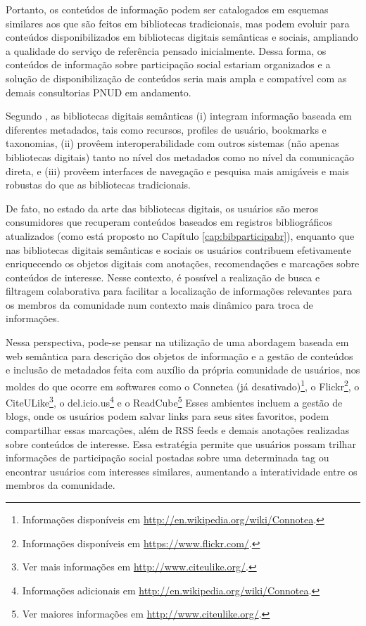 Portanto, os conteúdos de informação podem ser catalogados em esquemas similares aos que são feitos em bibliotecas tradicionais, mas podem evoluir para conteúdos disponibilizados em bibliotecas digitais semânticas e sociais, ampliando a qualidade do serviço de referência pensado inicialmente. Dessa forma, os conteúdos de informação sobre participação social estariam organizados e a solução de disponibilização de conteúdos seria mais ampla e compatível com as demais consultorias PNUD em andamento.

Segundo \cite{kruk2008semantic}, as bibliotecas digitais semânticas (i) integram informação baseada em diferentes metadados, tais como recursos, profiles de usuário, bookmarks e taxonomias, (ii) provêem interoperabilidade com outros sistemas (não apenas bibliotecas digitais) tanto no nível dos metadados como no nível da comunicação direta, e (iii) provêem interfaces de navegação e pesquisa  mais amigáveis e mais robustas do que as bibliotecas tradicionais.

De fato, no estado da arte das bibliotecas digitais, os usuários são meros consumidores que recuperam conteúdos baseados em registros bibliográficos atualizados (como está proposto no Capítulo \ref{cap:bibparticipabr}), enquanto que nas bibliotecas digitais semânticas e sociais os usuários contribuem efetivamente enriquecendo os objetos digitais com anotações, recomendações e marcações sobre conteúdos de interesse. Nesse contexto, é possível a realização de busca e filtragem colaborativa para facilitar a localização de informações relevantes para os membros da comunidade num contexto mais dinâmico para troca de informações.

Nessa perspectiva, pode-se pensar na utilização de uma abordagem baseada em web semântica para descrição dos objetos de informação e a gestão de conteúdos e inclusão de metadados feita com auxílio da própria comunidade de usuários, nos moldes do que ocorre em softwares como o Connetea (já desativado)\footnote{Informações disponíveis em \url{http://en.wikipedia.org/wiki/Connotea}.}, o Flickr\footnote{Informações disponíveis em \url{https://www.flickr.com/}.}, o CiteULike\footnote{Ver mais informações em \url{http://www.citeulike.org/}.}, o del.icio.us\footnote{Informações adicionais em \url{http://en.wikipedia.org/wiki/Connotea}.} e o ReadCube\footnote{Ver maiores informações em \url{http://www.citeulike.org/}.} Esses ambientes incluem a gestão de blogs, onde os usuários podem salvar links para seus sites favoritos, podem compartilhar essas marcações, além de RSS feeds e demais anotações realizadas sobre conteúdos de interesse. Essa estratégia permite que  usuários possam trilhar informações de participação social postadas sobre uma determinada tag ou encontrar usuários com interesses similares, aumentando a interatividade entre os membros da comunidade.

